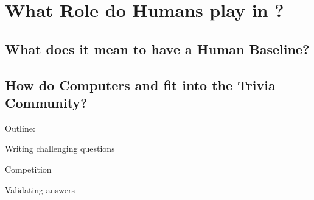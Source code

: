 
\section{What Role do Humans play in \qa{}?}
\label{sec:human}

\subsection{What does it mean to have a Human Baseline?}


\subsection{How do Computers and \qa{} fit into the Trivia Community?}

Outline:
\begin{enumerate*}
    \item Writing challenging questions
    \item Competition
    \item Validating answers
\end{enumerate*}